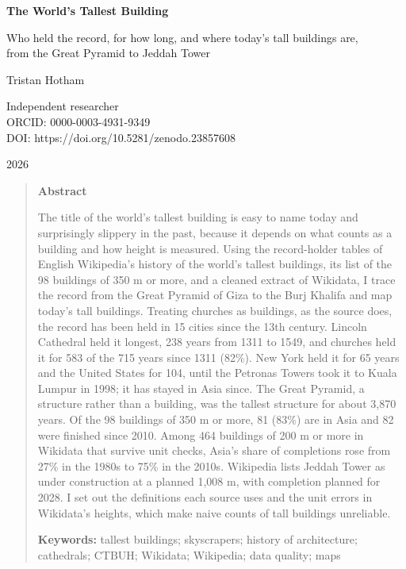 \documentclass[11pt,a4paper]{article}
\begin{document}
\begin{center}
{\Large\bfseries The World's Tallest Building\par}
\vspace{0.4em}
{\large Who held the record, for how long, and where today's tall buildings are,\\from the Great Pyramid to Jeddah Tower\par}
\vspace{1.2em}
{\large Tristan Hotham\par}
\vspace{0.3em}
{\small Independent researcher\\
ORCID: 0000-0003-4931-9349\\
DOI: https://doi.org/10.5281/zenodo.23857608\par}
\vspace{0.8em}
2026
\end{center}

\begin{quote}
\small
\begin{center}\textbf{Abstract}\end{center}
The title of the world's tallest building is easy to name today and surprisingly slippery in the past, because it depends on what counts as a building and how height is measured. Using the record-holder tables of English Wikipedia's history of the world's tallest buildings, its list of the 98 buildings of 350 m or more, and a cleaned extract of Wikidata, I trace the record from the Great Pyramid of Giza to the Burj Khalifa and map today's tall buildings. Treating churches as buildings, as the source does, the record has been held in 15 cities since the 13th century. Lincoln Cathedral held it longest, 238 years from 1311 to 1549, and churches held it for 583 of the 715 years since 1311 (82\%). New York held it for 65 years and the United States for 104, until the Petronas Towers took it to Kuala Lumpur in 1998; it has stayed in Asia since. The Great Pyramid, a structure rather than a building, was the tallest structure for about 3,870 years. Of the 98 buildings of 350 m or more, 81 (83\%) are in Asia and 82 were finished since 2010. Among 464 buildings of 200 m or more in Wikidata that survive unit checks, Asia's share of completions rose from 27\% in the 1980s to 75\% in the 2010s. Wikipedia lists Jeddah Tower as under construction at a planned 1,008 m, with completion planned for 2028. I set out the definitions each source uses and the unit errors in Wikidata's heights, which make naive counts of tall buildings unreliable.

\textbf{Keywords:} tallest buildings; skyscrapers; history of architecture; cathedrals; CTBUH; Wikidata; Wikipedia; data quality; maps
\end{quote}
\end{document}

